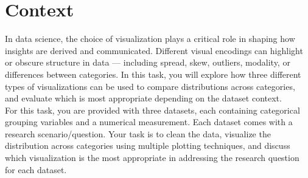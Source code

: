 \section*{Context}
In data science, the choice of visualization plays a critical role in shaping how insights are derived and communicated. Different visual encodings can highlight or obscure structure in data — including spread, skew, outliers, modality, or differences between categories. In this task, you will explore how three different types of visualizations can be used to compare distributions across categories, and evaluate which is most appropriate depending on the dataset context.\\

For this task, you are provided with three datasets, each containing categorical grouping variables and a numerical measurement. Each dataset comes with a research scenario/question. Your task is to clean the data, visualize the distribution across categories using multiple plotting techniques, and discuss which visualization is the most appropriate in addressing the research question for each dataset.
